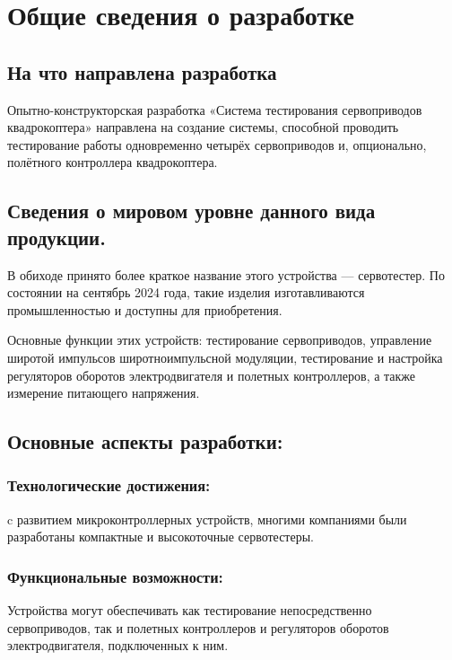 \documentclass[a4paper]{bsuir-tor}
\begin{document}


\section{Общие сведения о разработке}

\subsection{На что направлена разработка \newline}

  Опытно-конструкторская разработка
  «Система тестирования сервоприводов квадрокоптера»
  направлена на создание системы,
  способной проводить тестирование работы одновременно
  четырёх сервоприводов и, опционально, полётного контроллера
  квадрокоптера.

  \subsection{Сведения о мировом уровне данного вида продукции. \newline}
  
  В обиходе принято более краткое название этого устройства — сервотестер.
  По состоянии на сентябрь 2024 года, такие изделия изготавливаются
  промышленностью и доступны для приобретения.
  
  Основные функции этих устройств: тестирование сервоприводов,
  управление широтой импульсов широтноимпульсной модуляции,
  тестирование и настройка регуляторов оборотов электродвигателя и
  полетных контроллеров, а также измерение питающего напряжения.
  \subsection{Основные аспекты разработки: }
  \subsubsection{Технологические достижения: }
  c развитием микроконтроллерных устройств, многими компаниями были
  разработаны компактные и высокоточные сервотестеры.
  \subsubsection{Функциональные возможности: }
  Устройства могут обеспечивать как тестирование непосредственно
  сервоприводов, так и полетных контроллеров и регуляторов оборотов
  электродвигателя, подключенных к ним.
\end{document}
